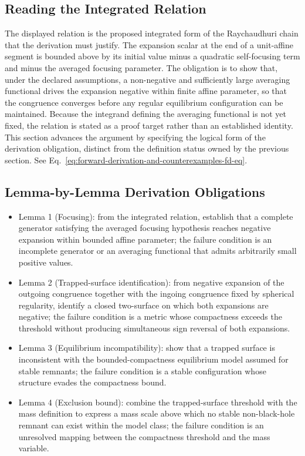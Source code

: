 \documentclass[conference]{IEEEtran}
\begin{document}
\subsection{Reading the Integrated Relation}
The displayed relation is the proposed integrated form of the Raychaudhuri chain that the derivation must justify. The expansion scalar at the end of a unit-affine segment is bounded above by its initial value minus a quadratic self-focusing term and minus the averaged focusing parameter. The obligation is to show that, under the declared assumptions, a non-negative and sufficiently large averaging functional drives the expansion negative within finite affine parameter, so that the congruence converges before any regular equilibrium configuration can be maintained. Because the integrand defining the averaging functional is not yet fixed, the relation is stated as a proof target rather than an established identity. This section advances the argument by specifying the logical form of the derivation obligation, distinct from the definition status owned by the previous section. See Eq.~\eqref{eq:forward-derivation-and-counterexamples-fd-eq}.

\subsection{Lemma-by-Lemma Derivation Obligations}
\begin{itemize}
\item Lemma 1 (Focusing): from the integrated relation, establish that a complete generator satisfying the averaged focusing hypothesis reaches negative expansion within bounded affine parameter; the failure condition is an incomplete generator or an averaging functional that admits arbitrarily small positive values.
\item Lemma 2 (Trapped-surface identification): from negative expansion of the outgoing congruence together with the ingoing congruence fixed by spherical regularity, identify a closed two-surface on which both expansions are negative; the failure condition is a metric whose compactness exceeds the threshold without producing simultaneous sign reversal of both expansions.
\item Lemma 3 (Equilibrium incompatibility): show that a trapped surface is inconsistent with the bounded-compactness equilibrium model assumed for stable remnants; the failure condition is a stable configuration whose structure evades the compactness bound.
\item Lemma 4 (Exclusion bound): combine the trapped-surface threshold with the mass definition to express a mass scale above which no stable non-black-hole remnant can exist within the model class; the failure condition is an unresolved mapping between the compactness threshold and the mass variable.
\end{itemize}
\end{document}
